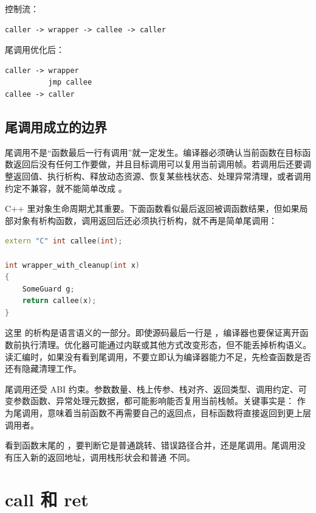 控制流：

\begin{lstlisting}
caller -> wrapper -> callee -> caller
\end{lstlisting}

尾调用优化后：

\begin{lstlisting}
caller -> wrapper
          jmp callee
callee -> caller
\end{lstlisting}

\subsection{尾调用成立的边界}

尾调用不是“函数最后一行有调用”就一定发生。编译器必须确认当前函数在目标函数返回后没有任何工作要做，并且目标调用可以复用当前调用帧。若调用后还要调整返回值、执行析构、释放动态资源、恢复某些栈状态、处理异常清理，或者调用约定不兼容，就不能简单改成 。

C++ 里对象生命周期尤其重要。下面函数看似最后返回被调函数结果，但如果局部对象有析构函数，调用返回后还必须执行析构，就不再是简单尾调用：

\begin{lstlisting}[language=C++]
extern "C" int callee(int);

int wrapper_with_cleanup(int x)
{
    SomeGuard g;
    return callee(x);
}
\end{lstlisting}

这里  的析构是语言语义的一部分。即使源码最后一行是 ，编译器也要保证离开函数前执行清理。优化器可能通过内联或其他方式改变形态，但不能丢掉析构语义。读汇编时，如果没有看到尾调用，不要立即认为编译器能力不足，先检查函数是否还有隐藏清理工作。

尾调用还受 ABI 约束。参数数量、栈上传参、栈对齐、返回类型、调用约定、可变参数函数、异常处理元数据，都可能影响能否复用当前栈帧。关键事实是： 作为尾调用，意味着当前函数不再需要自己的返回点，目标函数将直接返回到更上层调用者。

\begin{warningbox}
看到函数末尾的 ，要判断它是普通跳转、错误路径合并，还是尾调用。尾调用没有压入新的返回地址，调用栈形状会和普通  不同。
\end{warningbox}

\section{call 和 ret}

